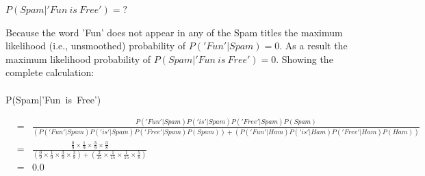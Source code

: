 \documentclass[solution]{ditpaper}
\begin{document}
\begin{enumerate}
					\begin{center}
				$P(Spam|'Fun~is~Free')=?$
			\end{center}
			\begin{answer}
				Because the word 'Fun' does not appear in any of the Spam titles the maximum likelihood (i.e., unsmoothed) probability of $P('Fun'|Spam)=0$. As a result the maximum likelihood probability of $P(Spam|'Fun~is~Free')=0$. Showing the complete calculation: \\
				\\
				P(Spam|'Fun~is~Free')
				\begin{scriptsize}
				\begin{eqnarray*}
					&=& \frac{P('Fun'|Spam)P('is'|Spam)P('Free'|Spam)P(Spam)}{(P('Fun'|Spam)P('is'|Spam)P('Free'|Spam)P(Spam))+(P('Fun'|Ham)P('is'|Ham)P('Free'|Ham)P(Ham))}\\
					&=& \frac{\frac{0}{9} \times \frac{1}{9} \times \frac{3}{9} \times \frac{3}{8}}{(\frac{0}{9} \times \frac{1}{9} \times \frac{3}{9} \times \frac{3}{8})+(\frac{2}{15} \times \frac{1}{15} \times \frac{1}{15} \times \frac{5}{8})}\\
					&=& 0.0
				\end{eqnarray*}
				\end{scriptsize}
			\end{answer}
	\end{enumerate}
%
\newpage

\end{document}
